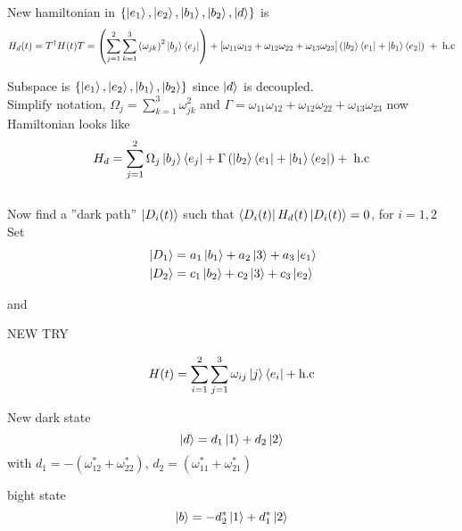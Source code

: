 New hamiltonian in $\{\ket{e_1}, \ket{e_2}, \ket{b_1}, \ket{b_2}, \ket{d} \}$ is 
\begin{equation}
H_d(t) = T^\dagger H(t) T = \left(\sum_{j = 1}^2 \sum_{k = 1}^3 \left( \omega_{jk} \right)^2 \ket{b_j}\bra{e_j}\right) + \left[\omega_{11}\omega_{12} + \omega_{12}\omega_{22} + \omega_{13}\omega_{23} \right]\left(\ket{b_2}\bra{e_1} + \ket{b_1}\bra{e_2}\right)\; + \;\text{h.c} 
\end{equation} 


Subspace is  $\{\ket{e_1}, \ket{e_2}, \ket{b_1}, \ket{b_2} \}$ since $\ket{d}$ is decoupled.\\
Simplify notation, $\Omega_j = \sum_{k = 1}^3 \omega_{jk}^2$ and $\Gamma = \omega_{11}\omega_{12} + \omega_{12}\omega_{22} + \omega_{13}\omega_{23}$ now Hamiltonian looks like 
\begin{equation}
H_d = \sum_{j = 1}^2 \Omega_j \ket{b_j}\bra{e_j} + \Gamma\left(\ket{b_2}\bra{e_1} + \ket{b_1}\bra{e_2} \right) + \; \text{h.c}
\end{equation}
\\
Now find a ''dark path'' $\ket{D_i(t)}$ such that $\bra{D_i(t)}H_d(t)\ket{D_i(t)} = 0$, for $i = 1,2$
\\ Set
\begin{equation}
\begin{aligned} &
 \ket{D_1} = a_1\ket{b_1} + a_2\ket{3} + a_3\ket{e_1}
 \\ &
 \ket{D_2} = c_1\ket{b_2} + c_2\ket{3} + c_3\ket{e_2}
 \end{aligned}
\end{equation}

and


\vspace{3cm}
NEW TRY

\begin{equation}
H(t) = \sum^2_{i = 1} \sum^3_{j = 1} \omega_{ij} \ket{j}\bra{e_i} + \text{h.c}
\end{equation}

New dark state 
\begin{equation}
\ket{d} = d_1\ket{1} + d_2\ket{2}
\end{equation}
with $d_1 = -(\omega_{12}^{*} + \omega_{22}^{*})$, $d_2 = (\omega_{11}^{*} + \omega_{21}^{*})$

bight state 
\begin{equation}
\ket{b} = -d_2^{*}\ket{1} + d_1^{*}\ket{2}
\end{equation}

